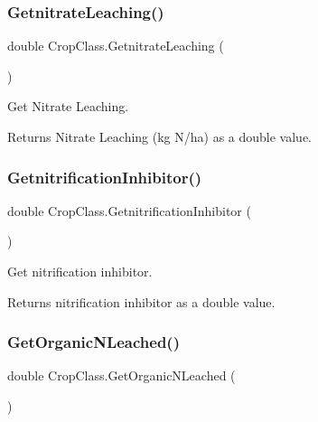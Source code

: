 \subsubsection{\texorpdfstring{GetnitrateLeaching()}{GetnitrateLeaching()}}
{\footnotesize\ttfamily double Crop\+Class.\+Getnitrate\+Leaching (\begin{DoxyParamCaption}{ }\end{DoxyParamCaption})\hspace{0.3cm}{\ttfamily [inline]}}



Get Nitrate Leaching. 

\begin{DoxyReturn}{Returns}
Nitrate Leaching (kg N/ha) as a double value. 
\end{DoxyReturn}
\mbox{\label{class_crop_class_a1794eb154398af192565e22a13a6843c}} 
\subsubsection{\texorpdfstring{GetnitrificationInhibitor()}{GetnitrificationInhibitor()}}
{\footnotesize\ttfamily double Crop\+Class.\+Getnitrification\+Inhibitor (\begin{DoxyParamCaption}{ }\end{DoxyParamCaption})\hspace{0.3cm}{\ttfamily [inline]}}



Get nitrification inhibitor. 

\begin{DoxyReturn}{Returns}
nitrification inhibitor as a double value. 
\end{DoxyReturn}
\mbox{\label{class_crop_class_a3dffe78f0226cc2e1370203db374a148}} 
\subsubsection{\texorpdfstring{GetOrganicNLeached()}{GetOrganicNLeached()}}
{\footnotesize\ttfamily double Crop\+Class.\+Get\+Organic\+N\+Leached (\begin{DoxyParamCaption}{ }\end{DoxyParamCaption})\hspace{0.3cm}{\ttfamily [inline]}}



